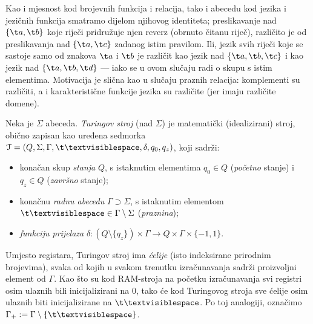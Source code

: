 \begin{napomena}
Kao i mjesnost kod brojevnih funkcija i relacija, tako i abecedu kod jezika i jezičnih funkcija smatramo dijelom njihovog identiteta; preslikavanje nad $\{\t a,\t b\}$ koje riječi pridružuje njen reverz (obrnuto čitanu riječ), različito je od preslikavanja nad $\{\t a,\t c\}$ zadanog istim pravilom. Ili, jezik svih riječi koje se sastoje samo od znakova $\t a$ i $\t b$ je različit kao jezik nad $\{\t a,\t b,\t c\}$ i kao jezik nad $\{\t a,\t b,\t d\}$ --- iako se u ovom slučaju radi o skupu s istim elementima. Motivacija je slična kao u slučaju praznih relacija: komplementi su različiti, a i karakteristične funkcije jezika su različite (jer imaju različite domene).
\end{napomena}

\begin{definicija}
Neka je $\Sigma$ abeceda. \emph{Turingov stroj} (nad $\Sigma$) je matematički (idealizirani) stroj, obično zapisan kao uređena sedmorka $\mathcal T=(Q,\Sigma,\Gamma,\bl,\delta,q_0,q_z)$, koji sadrži:
\begin{itemize}
    \item konačan skup \emph{stanja} $Q$, s istaknutim elementima $q_0\in Q$ (\emph{početno} stanje) i $q_z\in Q$ (\emph{završno} stanje);
    \item konačnu \emph{radnu abecedu} $\Gamma\supset\Sigma$, s istaknutim elementom $\bl\in\Gamma\setminus\Sigma$ (\emph{praznina});
    \item \emph{funkciju prijelaza} $\delta\colon(Q\setminus\{q_z\})\times\Gamma\to Q\times\Gamma\times\{-1,1\}$.\qedhere
\end{itemize}
\end{definicija}

Umjesto registara, Turingov stroj ima \emph{ćelije} (isto indeksirane prirodnim brojevima), svaka od kojih u svakom trenutku izračunavanja sadrži proizvoljni element od $\Gamma$. Kao što su kod RAM-stroja na početku izračunavanja svi registri osim ulaznih bili inicijalizirani na $0$, tako će kod Turingovog stroja sve ćelije osim ulaznih biti inicijalizirane na $\bl$. Po toj analogiji, označimo $\Gamma_+:=\Gamma\setminus\{\bl\}$.

